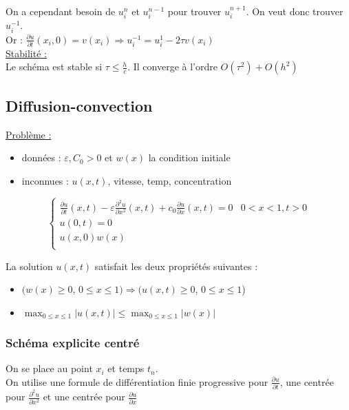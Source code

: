 \documentclass[../main.tex]{subfiles}
\begin{document}
On a cependant besoin de $u_i^n$ et $u_i^{n-1}$ pour trouver $u_i^{n+1}$. On veut donc trouver $u_i^{-1}$.\\
Or : $\frac{\partial u}{\partial t}(x_i,0) = v(x_i) \Rightarrow u_i^{-1} = u_i^1 - 2\tau v(x_i)$\\

\quad \underline{Stabilité :}\\
Le schéma est stable si $\tau \leq \frac{h}{c}$. Il converge à l'ordre $O(\tau^2)+O(h^2)$\\

\subsection{Diffusion-convection}
\quad \underline{Problème :} \begin{itemize}
    \item données : $\varepsilon, C_0>0$ et $w(x)$ la condition initiale\\
    \item inconnues : $u(x,t)$, vitesse, temp, concentration\\
\end{itemize}

\begin{equation}
    \begin{cases}
        \frac{\partial u}{\partial t}(x,t)-\varepsilon \frac{\partial^2 u}{\partial x^2}(x,t) + c_0 \frac{\partial u}{\partial x}(x,t) = 0 & 0<x<1, t>0\\
        u(0,t) = 0\\
        u(x,0) w(x)\\
    \end{cases}
\end{equation}

La solution $u(x,t)$ satisfait les deux propriétés suivantes : \begin{itemize}
    \item $(w(x) \geq 0$, $0\leq x \leq 1) \Rightarrow (u(x,t)\geq 0$, $0\leq x \leq 1$)\\
    \item $\max_{0\leq x \leq 1} \lvert u(x,t) \rvert \leq \max_{0\leq x \leq 1} \lvert w(x) \rvert$\\
\end{itemize}

\subsubsection{Schéma explicite centré}
On se place au point $x_i$ et temps $t_n$.\\
On utilise une formule de différentiation finie progressive pour $\frac{\partial u}{\partial t}$, une centrée pour $\frac{\partial^2 u}{\partial x^2}$ et une centrée pour $\frac{\partial u}{\partial x}$\\
\end{document}
